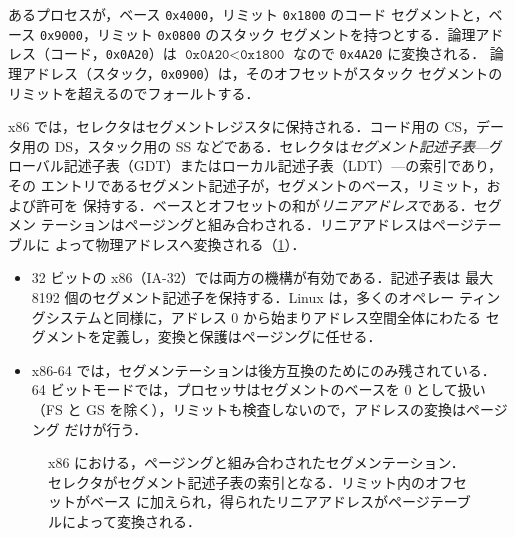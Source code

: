 \documentclass[../main.tex]{subfiles}
\begin{document}
\begin{example}
  あるプロセスが，ベース \texttt{0x4000}，リミット \texttt{0x1800} のコード
  セグメントと，ベース \texttt{0x9000}，リミット \texttt{0x0800} のスタック
  セグメントを持つとする．論理アドレス（コード，\texttt{0x0A20}）は
  $\texttt{0x0A20} < \texttt{0x1800}$ なので \texttt{0x4A20} に変換される．
  論理アドレス（スタック，\texttt{0x0900}）は，そのオフセットがスタック
  セグメントのリミットを超えるのでフォールトする．
\end{example}

x86 では，セレクタはセグメントレジスタに保持される．コード用の CS，データ用の
DS，スタック用の SS などである．セレクタは\emph{セグメント記述子表}---グ
ローバル記述子表（GDT）またはローカル記述子表（LDT）---の索引であり，その
エントリであるセグメント記述子が，セグメントのベース，リミット，および許可を
保持する．ベースとオフセットの和が\emph{リニアアドレス}である．セグメン
テーションはページングと組み合わされる．リニアアドレスはページテーブルに
よって物理アドレスへ変換される（\cref{fig:l08-segmentation}）．
\begin{itemize}
  \item 32 ビットの x86（IA-32）では両方の機構が有効である．記述子表は
    最大 8192 個のセグメント記述子を保持する．Linux は，多くのオペレー
    ティングシステムと同様に，アドレス 0 から始まりアドレス空間全体にわたる
    セグメントを定義し，変換と保護はページングに任せる．
  \item x86-64 では，セグメンテーションは後方互換のためにのみ残されている．
    64 ビットモードでは，プロセッサはセグメントのベースを 0 として扱い
    （FS と GS を除く），リミットも検査しないので，アドレスの変換はページング
    だけが行う．
\end{itemize}

\begin{figure}[htbp]
  \centering
  
  \caption{x86 における，ページングと組み合わされたセグメンテーション．
    セレクタがセグメント記述子表の索引となる．リミット内のオフセットがベース
    に加えられ，得られたリニアアドレスがページテーブルによって変換される．}
  \label{fig:l08-segmentation}
\end{figure}
\end{document}
